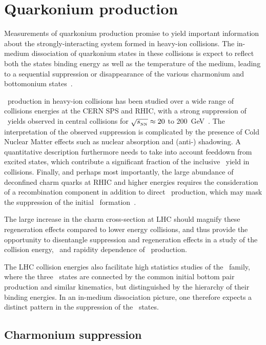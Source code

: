 \section{Quarkonium production}
\label{sec:qurkonia}
Measurements of quarkonium production promise to yield important information about the
strongly-interacting system formed in heavy-ion collisions.  The in-medium dissociation of quarkonium states
in these collisions is expect to reflect both the states binding energy as
well as the temperature of the medium, leading to a sequential suppression or disappearance
of the various charmonium and bottomonium states~\cite{Matsui:1986dk,Digal:2001ue}.

\jpsi\ production in heavy-ion collisions has been studied over a wide range of
collisions energies at the CERN SPS and RHIC, with a strong suppression of \jpsi\
yields observed in central collisions for $\sqrt{s_{_{\rm NN}}} \approx 20$ to
$200$~GeV~\cite{Alessandro:2004ap,Adare:2006ns,Adare:2011yf}.
The interpretation of the observed suppression is complicated by the presence
of Cold Nuclear Matter effects such as nuclear absorption and (anti-) shadowing. A quantitative
description furthermore needs to take into account feeddown from excited states,
which contribute a significant fraction of the inclusive \jpsi\ yield in \pp collisions.
Finally, and perhaps most importantly, the large abundance of deconfined charm quarks
at RHIC and higher energies requires the consideration of a recombination component
in addition to direct \jpsi\ production, which may mask the suppression of the initial
\jpsi\ formation~\cite{BraunMunzinger:2000px,Thews:2000rj,Andronic:2007bi,Zhao:2007hh}.

The large increase in the charm cross-section at LHC should magnify these regeneration
effects compared to lower energy collisions, and thus provide the opportunity to disentangle
suppression and regeneration effects in a study of the collision energy,
\pT\ and rapidity dependence of \jpsi\ production.

The LHC collision energies also facilitate high statistics studies of the \PgU\ family, where
the three \PgUn\ states are connected by the common initial bottom pair production and
similar kinematics, but distinguished by the hierarchy of their binding energies. In an
in-medium dissociation picture, one therefore expects a distinct pattern in the suppression
of the \PgUn\ states.

\subsection{Charmonium suppression}


